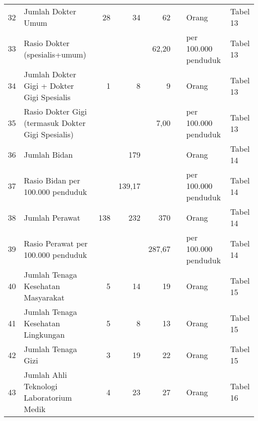 \begin{small}
\begin{longtable}{rY{12em}rrrrY{5em}Y{5em}}
	 32 & Jumlah Dokter Umum                                                          &     28 &     34 &                 62 &          & Orang                          & Tabel 13 \\
	 33 & Rasio Dokter (spesialis+umum)                                               &        &        &              62,20 &          & per 100.000 penduduk           & Tabel 13 \\
	 34 & Jumlah Dokter Gigi + Dokter Gigi Spesialis                                  &      1 &      8 &                  9 &          & Orang                          & Tabel 13 \\
	 35 & Rasio Dokter Gigi (termasuk Dokter Gigi Spesialis)                          &        &        &               7,00 &          & per 100.000 penduduk           & Tabel 13 \\
	 36 & Jumlah Bidan                                                                &        &    179 &                    &          & Orang                          & Tabel 14 \\
	 37 & Rasio Bidan per 100.000 penduduk                                            &        & 139,17 &                    &          & per 100.000 penduduk           & Tabel 14 \\
	 38 & Jumlah Perawat                                                              &    138 &    232 &                370 &          & Orang                          & Tabel 14 \\
	 39 & Rasio Perawat per 100.000 penduduk                                          &        &        &             287,67 &          & per 100.000 penduduk           & Tabel 14 \\
	 40 & Jumlah Tenaga Kesehatan Masyarakat                                          &      5 &     14 &                 19 &          & Orang                          & Tabel 15 \\
	 41 & Jumlah Tenaga Kesehatan Lingkungan                                          &      5 &      8 &                 13 &          & Orang                          & Tabel 15 \\
	 42 & Jumlah Tenaga Gizi                                                          &      3 &     19 &                 22 &          & Orang                          & Tabel 15 \\
	 43 & Jumlah Ahli Teknologi Laboratorium Medik                                    &      4 &     23 &                 27 &          & Orang                          & Tabel 16 \\

\end{longtable}
\end{small}
